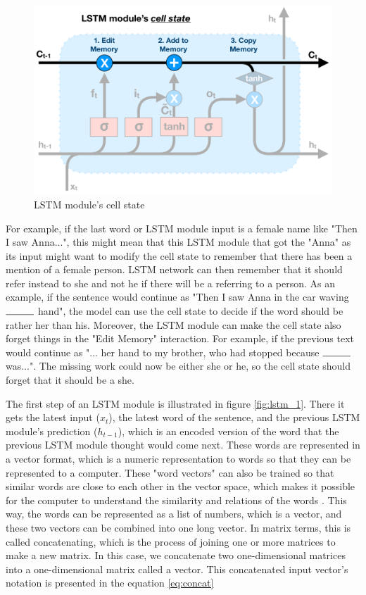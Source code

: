 \begin{figure}[h]
    \centering
    \includegraphics[width=12cm,height=\textheight,keepaspectratio]{lstm_cell_state}
    \caption{LSTM module's cell state}
    \label{fig:lstm_cell_state}
\end{figure}

For example, if the last word or LSTM module input is a female name like "Then I saw Anna...", this might mean that this LSTM module that got the "Anna" as its input might want to modify the cell state to remember that there has been a mention of a female person. LSTM network can then remember that it should refer instead to she and not he if there will be a referring to a person. As an example, if the sentence would continue as "Then I saw Anna in the car waving $\rule{1cm}{0.15mm}$ hand", the model can use the cell state to decide if the word should be rather her than his. Moreover, the LSTM module can make the cell state also forget things in the "Edit Memory" interaction. For example, if the previous text would continue as "... her hand to my brother, who had stopped because $\rule{1cm}{0.15mm}$ was...". The missing work could now be either she or he, so the cell state should forget that it should be a she.

The first step of an LSTM module is illustrated in figure \ref{fig:lstm_1}. There it gets the latest input ($x_t$), the latest word of the sentence, and the previous LSTM module's prediction ($h_{t-1}$), which is an encoded version of the word that the previous LSTM module thought would come next. These words are represented in a vector format, which is a numeric representation to words so that they can be represented to a computer. These "word vectors" can also be trained so that similar words are close to each other in the vector space, which makes it possible for the computer to understand the similarity and relations of the words \parencite{pennington2014glove,rong2014word2vec,mikolov2013efficient}. This way, the words can be represented as a list of numbers, which is a vector, and these two vectors can be combined into one long vector. In matrix terms, this is called concatenating, which is the process of joining one or more matrices to make a new matrix. In this case, we concatenate two one-dimensional matrices into a one-dimensional matrix called a vector. This concatenated input vector's notation is presented in the equation \ref{eq:concat}

